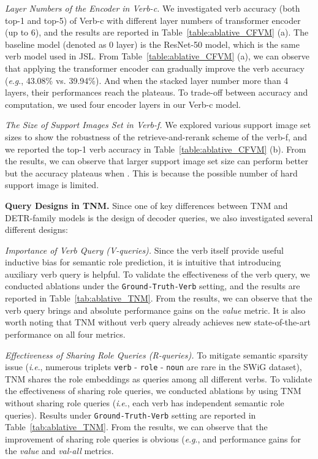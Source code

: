 \documentclass[letterpaper]{article} \usepackage{aaai22}  \usepackage{times}  \usepackage{helvet}  \usepackage{courier}  \usepackage[hyphens]{url}  \usepackage{graphicx} \urlstyle{rm} \def\UrlFont{\rm}  \usepackage{natbib}  \usepackage{caption} \DeclareCaptionStyle{ruled}{labelfont=normalfont,labelsep=colon,strut=off} \frenchspacing  \setlength{\pdfpagewidth}{8.5in}  \setlength{\pdfpageheight}{11in}
\newcommand{\ie}{\textit{i}.\textit{e}.}
\newcommand{\eg}{\textit{e}.\textit{g}.}
\begin{document}
\noindent\emph{Layer Numbers of the Encoder in Verb-c.} We investigated verb accuracy (both top-1 and top-5) of Verb-c with different layer numbers of transformer encoder (up to 6), and the results are reported in Table~\ref{table:ablative_CFVM} (a). The baseline model (denoted as 0 layer) is the ResNet-50 model, which is the same verb model used in JSL. From Table~\ref{table:ablative_CFVM} (a), we can observe that applying the transformer encoder can gradually improve the verb accuracy (\eg, 43.08\% vs. 39.94\%). And when the stacked layer number more than 4 layers, their performances reach the plateaus. To trade-off between accuracy and computation, we used four encoder layers in our Verb-c model.






\noindent\emph{The Size of Support Images Set in Verb-f.}
We explored various support image set sizes to show the robustness of the retrieve-and-rerank scheme of the verb-f, and we reported the top-1 verb accuracy in Table~\ref{table:ablative_CFVM} (b). From the results, we can observe that larger support image set size can perform better but the accuracy plateaus when . 
This is because the possible number of hard support image is limited. 


\noindent\textbf{Query Designs in TNM.} Since one of key differences between TNM and DETR-family models is the design of decoder queries, we also investigated several different designs:

\noindent\emph{Importance of Verb Query (V-queries).} Since the verb itself provide useful inductive bias for semantic role prediction, it is intuitive that introducing auxiliary verb query is helpful. To validate the effectiveness of the verb query, we conducted ablations under the \texttt{Ground-Truth-Verb} setting, and the results are reported in Table~\ref{tab:ablative_TNM}. From the results, we can observe that the verb query brings  and  absolute performance gains on the \emph{value} metric. It is also worth noting that TNM without verb query already achieves new state-of-the-art performance on all four metrics.



\noindent\emph{Effectiveness of Sharing Role Queries (R-queries).} To mitigate semantic sparsity issue (\ie, numerous triplets \texttt{verb} - \texttt{role} - \texttt{noun}  are rare in the SWiG dataset), TNM shares the role embeddings as queries among all different verbs. To validate the effectiveness of sharing role queries, we conducted ablations by using TNM without sharing role queries (\ie, each verb has independent semantic role queries). Results under \texttt{Ground-Truth-Verb} setting are reported in Table~\ref{tab:ablative_TNM}. From the results, we can observe that the improvement of sharing role queries is obvious (\eg,  and   performance gains for the \emph{value} and \emph{val-all} metrics.
\end{document}
